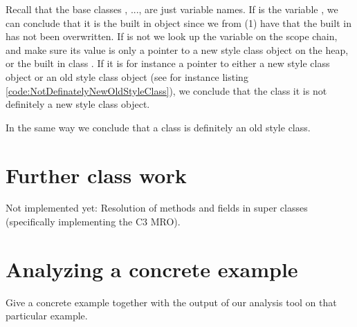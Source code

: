 Recall that the base classes , ...,  are just variable names. If  is the variable , we can conclude that it is the built in object since we from (1) have that the built in  has not been overwritten. If  is not  we look up the variable on the scope chain, and make sure its value is only a pointer to a new style class object on the heap, or the built in class . If it is for instance a pointer to either a new style class object or an old style class object (see for instance listing \ref{code:NotDefinatelyNewOldStyleClass}), we conclude that the class  it is not definitely a new style class object.

In the same way we conclude that a class is definitely an old style class.

\section{Further class work}
Not implemented yet: Resolution of methods and fields in super classes (specifically implementing the C3 MRO).

\section{Analyzing a concrete example}
Give a concrete example together with the output of our analysis tool on that particular example.
